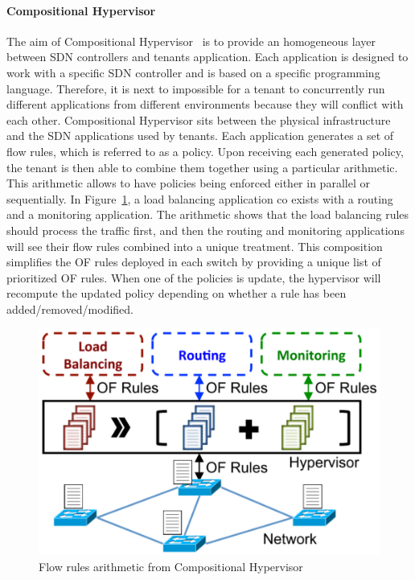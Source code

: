 \paragraph{Compositional Hypervisor}
The aim of Compositional Hypervisor~\cite{CompositionalHypervisor-Jin2014} is to provide an homogeneous layer between SDN controllers and tenants application.
Each application is designed to work with a specific SDN controller and is based on a specific programming language. Therefore, it is next to impossible for a tenant to concurrently run different applications from different environments because they will conflict with each other. Compositional Hypervisor sits between the physical infrastructure and the SDN applications used by tenants.
Each application generates a set of flow rules, which is referred to as a policy.
Upon receiving each generated policy, the tenant is then able to combine them together using a particular arithmetic.
This arithmetic allows to have policies being enforced either in parallel or sequentially. 
In Figure~\ref{fig:compositional-hyp}, a load balancing application co exists with a routing and a monitoring application. The arithmetic shows that the load balancing rules should process the traffic first, and then the routing and monitoring applications will see their flow rules combined into a unique treatment.
This composition simplifies the OF rules deployed in each switch by providing a unique list of prioritized OF rules. When one of the policies is update, the hypervisor will recompute the updated policy depending on whether a rule has been added/removed/modified.

\begin{figure}[ht]
    \centering
    \includegraphics[scale=0.7]{figures/compositional-structure.pdf}
    \caption{Flow rules arithmetic from Compositional Hypervisor~\cite{CompositionalHypervisor-Jin2014}}
    \label{fig:compositional-hyp}
\end{figure}

